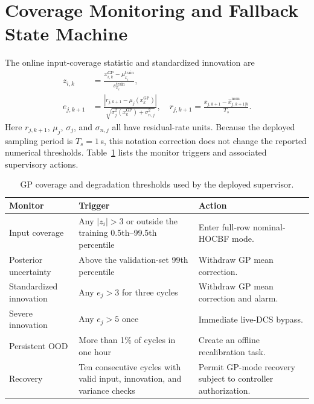 \section{Coverage Monitoring and Fallback State Machine}
\label{sec:supp_fallback}

The online input-coverage statistic and standardized innovation are
\begin{align}
    z_{i,k} &= \frac{x^{\mathrm{GP}}_{i,k}-\mu^{\mathrm{train}}_{x_i}}
    {s^{\mathrm{train}}_{x_i}}, \label{eq:S_z}\\
    e_{j,k+1} &=
    \frac{|r_{j,k+1}-\mu_j(x_k^{\mathrm{GP}})|}
    {\sqrt{\sigma_j^2(x_k^{\mathrm{GP}})+\sigma_{n,j}^2}},
    \quad
    r_{j,k+1}=\frac{x_{j,k+1}-\hat{x}^{\mathrm{nom}}_{j,k+1|k}}{T_s}.
    \label{eq:S_innovation}
\end{align}
Here $r_{j,k+1}$, $\mu_j$, $\sigma_j$, and $\sigma_{n,j}$ all have residual-rate units. Because the deployed sampling period is $T_s=1$\,s, this notation correction does not change the reported numerical thresholds. Table~\ref{tab:S_coverage_thresholds} lists the monitor triggers and associated supervisory actions.

\begin{table}[htbp]
    \centering
    \caption{GP coverage and degradation thresholds used by the deployed supervisor.}
    \label{tab:S_coverage_thresholds}
    \small
    \begin{tabular}{>{\raggedright\arraybackslash}p{}>{\raggedright\arraybackslash}p{}>{\raggedright\arraybackslash}p{}}
        \toprule
        Monitor & Trigger & Action \\
        \midrule
        Input coverage & Any $|z_i|>3$ or outside the training 0.5th--99.5th percentile & Enter full-row nominal-HOCBF mode. \\
        Posterior uncertainty & Above the validation-set 99th percentile & Withdraw GP mean correction. \\
        Standardized innovation & Any $e_j>3$ for three cycles & Withdraw GP mean correction and alarm. \\
        Severe innovation & Any $e_j>5$ once & Immediate live-DCS bypass. \\
        Persistent OOD & More than 1\% of cycles in one hour & Create an offline recalibration task. \\
        Recovery & Ten consecutive cycles with valid input, innovation, and variance checks & Permit GP-mode recovery subject to controller authorization. \\
        \bottomrule
    \end{tabular}
\end{table}


